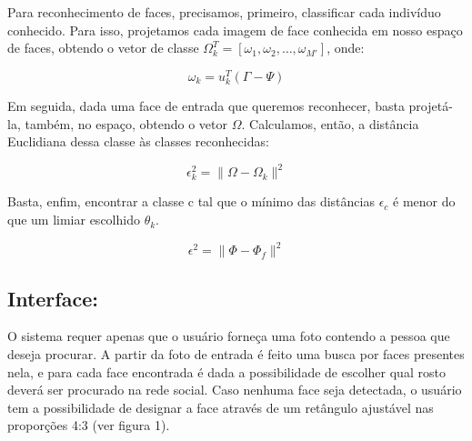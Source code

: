 \documentclass[10pt,a4paper]{article}
\begin{document}
Para reconhecimento de faces, precisamos, primeiro, classificar cada
indivíduo conhecido. Para isso, projetamos cada imagem de face
conhecida em nosso espaço de faces, obtendo o vetor de classe
$\Omega_k^T = [ \omega_1, \omega_2, \ldots,\omega_{M'} ]$, onde:



\begin{equation}
  \omega_k=u_k^T(\Gamma-\Psi)
\end{equation}


Em seguida, dada uma face de entrada que queremos reconhecer, basta
projetá-la, também, no espaço, obtendo o vetor $\Omega$. Calculamos,
então, a distância Euclidiana dessa classe às classes reconhecidas:

\begin{equation}
  \epsilon_k^2=\|\Omega-\Omega_k\|^2
\end{equation}

Basta, enfim, encontrar a classe c tal que o mínimo das distâncias $\epsilon_c$ é menor do que um limiar escolhido $\theta_k$.

\begin{equation}
  \epsilon^2=\|\Phi-\Phi_f\|^2
\end{equation}

\subsection*{Interface:}
O sistema requer apenas que o usuário forneça uma foto contendo a pessoa que deseja procurar. A partir da foto de entrada é feito uma busca por faces presentes nela, e para cada face encontrada é dada a possibilidade de escolher qual rosto deverá ser procurado na rede social. Caso nenhuma face seja detectada, o usuário tem a possibilidade de designar a face através de um retângulo ajustável nas proporções 4:3 (ver figura 1).
\end{document}
